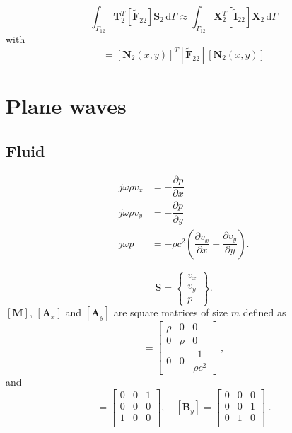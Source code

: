 \documentclass[11pt,A4paper]{book}
\newcommand{\ds}{\displaystyle}
\newcommand{\tb}{\textbf}
\newcommand{\tp}{^T}
\newcommand{\esp}{, \quad}
\newcommand{\p}{\partial}
\newcommand{\wdt}[1]{\widetilde{#1}}
\renewcommand{\d}{\,\textrm{d}}
\renewcommand{\:}{\tb{:}}
\begin{document}
\begin{equation}
	\ds{\int_{\Gamma_{12}}} 
\tb{T}_2\tp  [\wdt{\tb{F}}_{22}]\tb{S}_2
 \d\Gamma \approx \ds{\int_{\Gamma_{12}}} 
\tb{X}_2 \tp [\wdt{\tb{I}}_{22}]
\tb{X}_2
 \d\Gamma 
\end{equation}
with
\begin{equation}
[\wdt{\tb{I}}_{22}]=	\left[\tb{N}_2(x,y)\right]\tp[\wdt{\tb{F}}_{22}]\left[\tb{N}_2(x,y)\right]\end{equation}




\chapter{Plane waves}


\section{Fluid}

\begin{align}
j\omega{\rho}v_x&=- \dfrac{\p p}{\p x}\\
j\omega{\rho}v_y&=- \dfrac{\p p}{\p y}\\
j\omega p&=-\rho c^2\left(\dfrac{\p v_x}{\p x}+
\dfrac{\p v_y}{\p y}\right).
\end{align}


\begin{equation}
\tb{S}=
\left\{
\begin{array}{c}
v_x\\
v_y\\
p
\end{array}
\right\}.
\end{equation}
$[\tb{M}]$, $[\tb{A}_x]$ and $[\tb{A}_y]$ are square matrices of size $m$ defined as
\begin{equation}
[\tb{M}]=\left[
\begin{array}{ccc}
\rho&0&0\\
0&\rho&0\\
0&0&\dfrac{1}{\rho c^2}
\end{array}
\right]
\;,
\end{equation}
and
\begin{equation}
[\tb{B}_x]=\left[
\begin{array}{ccc}
0&0&1\\
0&0&0\\
1&0&0\\
\end{array}
\right]\esp
[\tb{B}_y]=\left[
\begin{array}{ccc}
0&0&0\\
0&0&1\\
0&1&0\\
\end{array}
\right]
\;.
\end{equation}
\end{document}
